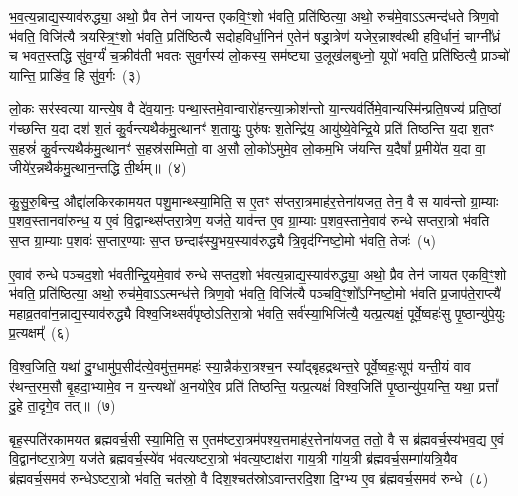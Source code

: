 भ॒व॒त्य॒न्नाद्य॒स्याव॑रुद्ध्या॒ अथो॒ प्रैव तेन॑ जायन्त एकवि॒ꣳ॒शो भ॑वति॒ प्रति॑ष्ठित्या॒ अथो॒ रुच॑मे॒वा\-ऽऽ\-त्मन्द॑धते त्रिण॒वो भ॑वति॒ विजि॑त्यै त्रयस्त्रि॒ꣳ॒शो भ॑वति॒ प्रति॑ष्ठित्यै सदोहविर्धा॒निन॑ ए॒तेन॑ षड्रा॒त्रेण॑ यजेर॒न्नाश्व॑त्थी हवि॒र्धानं॒ चाग्नी᳚ध्रं च भवत॒स्तद्धि सु॑व॒र्ग्यं॑ च॒क्रीव॑ती भवतः सुव॒र्गस्य॑ लो॒कस्य॒ सम॑ष्ट्या उ॒लूख॑लबुध्नो॒ यूपो॑ भवति॒ प्रति॑ष्ठित्यै॒ प्राञ्चो॑ यान्ति॒ प्राङि॑व॒ हि सु॑व॒र्गः~(३)

लो॒कः सर॑स्वत्या यान्त्ये॒ष वै दे॑व॒यानः॒ पन्था॒स्तमे॒वान्वारो॑हन्त्या॒क्रोश॑न्तो या॒न्त्यव॑र्तिमे॒वान्यस्मि॑न्प्रति॒षज्य॑ प्रति॒ष्ठां ग॑च्छन्ति य॒दा दश॑ श॒तं कु॒र्वन्त्यथैक॑मु॒त्थानꣳ॑ श॒तायुः॒ पुरु॑षः श॒तेन्द्रि॑य॒ आयु॑ष्ये॒वेन्द्रि॒ये प्रति॑ तिष्ठन्ति य॒दा श॒तꣳ स॒हस्रं॑ कु॒र्वन्त्यथैक॑मु॒त्थानꣳ॑ स॒हस्र॑सम्मितो॒ वा अ॒सौ लो॒को॑\-ऽमुमे॒व लो॒कम॒भि ज॑यन्ति य॒दैषां᳚ प्र॒मीये॑त य॒दा वा॒ जीये॑र॒न्नथैक॑मु॒त्थान॒न्तद्धि ती॒र्थम्॥~(४)

{\anuvakamend[{पृ॒ष्ठानि॑ सप्तद॒शः सु॑व॒र्गो ज॑यन्ति य॒दैका॑\-दश च}]}%

कु॒सु॒रु॒बिन्द॒ औद्दा॑लकिरकामयत पशु॒मान्थ्स्या॒मिति॒ स ए॒तꣳ स॑प्तरा॒त्रमाह॑र॒त्तेना॑यजत॒ तेन॒ वै स याव॑न्तो ग्रा॒म्याः प॒शव॒स्तानवा॑रुन्ध॒ य ए॒वं वि॒द्वान्थ्स॑प्तरा॒त्रेण॒ यज॑ते॒ याव॑न्त ए॒व ग्रा॒म्याः प॒शव॒स्ताने॒वाव॑ रुन्धे सप्तरा॒त्रो भ॑वति स॒प्त ग्रा॒म्याः प॒शवः॑ स॒प्तार॒ण्याः स॒प्त छन्दाꣴ॑स्यु॒भय॒स्याव॑रुद्ध्यै त्रि॒वृद॑ग्निष्टो॒मो भ॑वति॒ तेजः॑~(५)

ए॒वाव॑ रुन्धे पञ्चद॒शो भ॑वतीन्द्रि॒यमे॒वाव॑ रुन्धे सप्तद॒शो भ॑वत्य॒न्नाद्य॒स्याव॑रुद्ध्या॒ अथो॒ प्रैव तेन॑ जायत एकवि॒ꣳ॒शो भ॑वति॒ प्रति॑ष्ठित्या॒ अथो॒ रुच॑मे॒वा\-ऽऽ\-त्मन्ध॑त्ते त्रिण॒वो भ॑वति॒ विजि॑त्यै पञ्चवि॒ꣳ॒शो᳚\-ऽग्निष्टो॒मो भ॑वति प्र॒जा\-प॑ते॒राप्त्यै॑ महाव्र॒तवा॑न॒न्नाद्य॒स्याव॑रुद्ध्यै विश्व॒जिथ्सर्व॑पृष्ठो\-ऽतिरा॒त्रो भ॑वति॒ सर्व॑स्या॒भिजि॑त्यै॒ यत्प्र॒त्यक्षं॒ पूर्वे॒ष्वहः॑सु पृ॒ष्ठान्यु॑पे॒युः प्र॒त्यक्षम्᳚~(६)

वि॒श्व॒जिति॒ यथा॑ दु॒ग्धामु॑प॒सीद॑त्ये॒वमु॑त्त॒ममहः॑ स्या॒न्नैक॑रा॒त्रश्च॒न स्या᳚द्बृहद्रथन्त॒रे पूर्वे॒ष्वहः॒सूप॑ यन्ती॒यं वाव र॑थन्त॒रम॒सौ बृ॒हदा॒भ्यामे॒व न य॒न्त्यथो॑ अ॒नयो॑रे॒व प्रति॑ तिष्ठन्ति॒ यत्प्र॒त्यक्षं॑ विश्व॒जिति॑ पृ॒ष्ठान्यु॑प॒यन्ति॒ यथा॒ प्रत्तां᳚ दु॒हे ता॒दृगे॒व तत्॥~(७)

{\anuvakamend[{तेज॑ उपे॒युः प्र॒त्यक्षं॒ द्विच॑त्वारिꣳशच्च}]}%

बृह॒स्पति॑रकामयत ब्रह्मवर्च॒सी स्या॒मिति॒ स ए॒तम॑ष्टरा॒त्रम॑पश्य॒त्तमाह॑र॒त्तेना॑यजत॒ ततो॒ वै स ब्र॑ह्मवर्च॒स्य॑भव॒द्य ए॒वं वि॒द्वान॑ष्टरा॒त्रेण॒ यज॑ते ब्रह्मवर्च॒स्ये॑व भ॑वत्यष्टरा॒त्रो भ॑वत्य॒ष्टाक्ष॑रा गाय॒त्री गा॑य॒त्री ब्र॑ह्मवर्च॒सम्गा॑यत्रि॒यैव ब्र॑ह्मवर्च॒समव॑ रुन्धे\-ऽष्टरा॒त्रो भ॑वति॒ चत॑स्रो॒ वै दिश॒श्चत॑स्रो\-ऽवान्तरदि॒शा दि॒ग्भ्य ए॒व ब्र॑ह्मवर्च॒समव॑ रुन्धे~(८)

